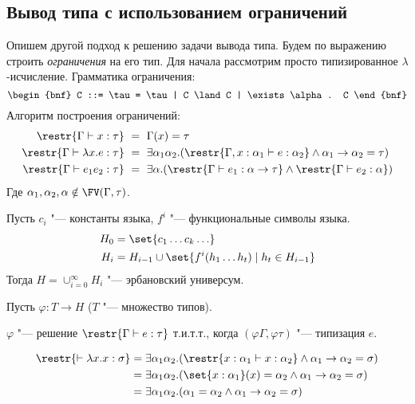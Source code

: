 \subsection*{\texorpdfstring{Вывод типа с использованием ограничений}{Constraint-based type inference}}
\todo
Опишем другой подход к решению задачи вывода типа.
Будем по выражению строить \emph{ограничения} на его тип.
Для начала рассмотрим просто типизированное $\lambda$-исчисление.
Грамматика ограничения:
\[
    \begin{bnf} C ::= \tau = \tau | C \land C | \exists \alpha . C \end{bnf}
\]
Алгоритм построения ограничений:
\begin{align*}
    \restr{\Gamma \vdash x : \tau} \ &=\  \Gamma(x) = \tau \\
    \restr{\Gamma \vdash \lambda x . e : \tau} \ &=\ 
        \exists \alpha_1 \alpha_2 . (\restr{\Gamma, x : \alpha_1\vdash e:\alpha_2} \land \alpha_1\rightarrow\alpha_2=\tau) \\
    \restr{\Gamma \vdash e_1 e_2 : \tau} \ &=\ 
        \exists\alpha.(\restr{\Gamma\vdash e_1 :\alpha\rightarrow\tau} \land \restr{\Gamma\vdash e_2 : \alpha})
\end{align*}
Где $\alpha_1, \alpha_2, \alpha \notin \FV(\Gamma, \tau)$.

\begin{definition}
    Пусть $c_i$ "--- константы языка, $f^i$ "--- функциональные символы языка.
    \begin{align*}
        H_0 &= \set{c_1 \ldots c_k \ldots} \\
        H_i &= H_{i-1} \cup \set{f^i(h_1 \ldots h_t) \mid h_t \in H_{i-1}}
    \end{align*}
    Тогда $H = \cup_{i=0}^{\infty} H_i$ "--- эрбановский универсум.
\end{definition}

Пусть $\varphi : T \rightarrow H$ ($T$ "--- множество типов).

\begin{theorem}
    $\varphi$ "--- решение $\restr{\Gamma\vdash e : \tau}$ т.и.т.т., когда $(\varphi\Gamma, \varphi\tau)$ "--- типизация $e$.
\end{theorem}

\begin{example}
    \begin{align*}
        \restr{\vdash \lambda x . x : \sigma}
        &= \exists \alpha_1 \alpha_2. (\restr{x : \alpha_1 \vdash x : \alpha_2} \land \alpha_1\rightarrow\alpha_2 = \sigma) \\
        &= \exists \alpha_1 \alpha_2. (\set{x : \alpha_1}(x) = \alpha_2 \land \alpha_1\rightarrow\alpha_2 = \sigma) \\
        &= \exists \alpha_1 \alpha_2. (\alpha_1 = \alpha_2 \land \alpha_1\rightarrow\alpha_2 = \sigma)
    \end{align*}
\end{example}

